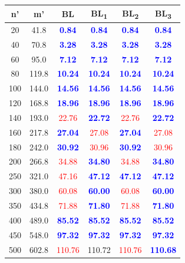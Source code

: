 \begin{tabular}{|c|c|c|c|c|c|}
\hline
\rowcolor{gray!30} \textbf{n'} &  \textbf{m'} &  \textbf{BL} &  \textbf{BL\textsubscript{1}} &  \textbf{BL\textsubscript{2}} &  \textbf{BL\textsubscript{3}}\\ \hline
20 & 41.8 & \textbf{\textcolor{blue}{0.84}} & \textbf{\textcolor{blue}{0.84}} & \textbf{\textcolor{blue}{0.84}} & \textbf{\textcolor{blue}{0.84}}\\
40 & 70.8 & \textbf{\textcolor{blue}{3.28}} & \textbf{\textcolor{blue}{3.28}} & \textbf{\textcolor{blue}{3.28}} & \textbf{\textcolor{blue}{3.28}}\\
60 & 95.0 & \textbf{\textcolor{blue}{7.12}} & \textbf{\textcolor{blue}{7.12}} & \textbf{\textcolor{blue}{7.12}} & \textbf{\textcolor{blue}{7.12}}\\
80 & 119.8 & \textbf{\textcolor{blue}{10.24}} & \textbf{\textcolor{blue}{10.24}} & \textbf{\textcolor{blue}{10.24}} & \textbf{\textcolor{blue}{10.24}}\\
100 & 144.0 & \textbf{\textcolor{blue}{14.56}} & \textbf{\textcolor{blue}{14.56}} & \textbf{\textcolor{blue}{14.56}} & \textbf{\textcolor{blue}{14.56}}\\
120 & 168.8 & \textbf{\textcolor{blue}{18.96}} & \textbf{\textcolor{blue}{18.96}} & \textbf{\textcolor{blue}{18.96}} & \textbf{\textcolor{blue}{18.96}}\\
140 & 193.0 & \textcolor{red}{22.76} & \textbf{\textcolor{blue}{22.72}} & \textcolor{red}{22.76} & \textbf{\textcolor{blue}{22.72}}\\
160 & 217.8 & \textbf{\textcolor{blue}{27.04}} & \textcolor{red}{27.08} & \textbf{\textcolor{blue}{27.04}} & \textcolor{red}{27.08}\\
180 & 242.0 & \textbf{\textcolor{blue}{30.92}} & \textcolor{red}{30.96} & \textbf{\textcolor{blue}{30.92}} & \textcolor{red}{30.96}\\
200 & 266.8 & \textcolor{red}{34.88} & \textbf{\textcolor{blue}{34.80}} & \textcolor{red}{34.88} & \textbf{\textcolor{blue}{34.80}}\\
250 & 321.0 & \textcolor{red}{47.16} & \textbf{\textcolor{blue}{47.12}} & \textbf{\textcolor{blue}{47.12}} & \textbf{\textcolor{blue}{47.12}}\\
300 & 380.0 & \textcolor{red}{60.08} & \textbf{\textcolor{blue}{60.00}} & \textcolor{red}{60.08} & \textbf{\textcolor{blue}{60.00}}\\
350 & 434.8 & \textcolor{red}{71.88} & \textbf{\textcolor{blue}{71.80}} & \textcolor{red}{71.88} & \textbf{\textcolor{blue}{71.80}}\\
400 & 489.0 & \textbf{\textcolor{blue}{85.52}} & \textbf{\textcolor{blue}{85.52}} & \textbf{\textcolor{blue}{85.52}} & \textbf{\textcolor{blue}{85.52}}\\
450 & 548.0 & \textbf{\textcolor{blue}{97.32}} & \textbf{\textcolor{blue}{97.32}} & \textbf{\textcolor{blue}{97.32}} & \textbf{\textcolor{blue}{97.32}}\\
500 & 602.8 & \textcolor{red}{110.76} & 110.72 & \textcolor{red}{110.76} & \textbf{\textcolor{blue}{110.68}}\\
\hline
\end{tabular}
